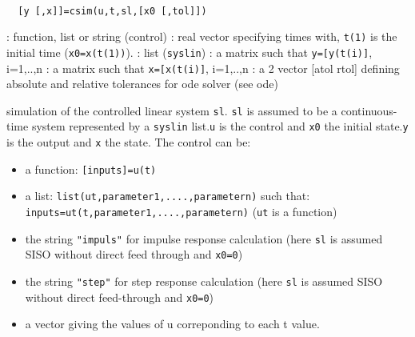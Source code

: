 \begin{mandesc}
   \\ %
\end{mandesc}
\begin{calling_sequence}
\begin{verbatim}
  [y [,x]]=csim(u,t,sl,[x0 [,tol]])  
\end{verbatim}
\end{calling_sequence}
\begin{parameters}
  \begin{varlist}
    : function, list or string (control)
    : real vector specifying times with, \verb!t(1)! is the initial
    time (\verb!x0=x(t(1))!).
    : list (\verb!syslin!)
    : a  matrix such that   \verb!y=[y(t(i)]!, i=1,..,n
    : a  matrix such that   \verb!x=[x(t(i)]!, i=1,..,n
    : a 2 vector [atol rtol] defining absolute and relative
    tolerances for ode solver (see ode)
  \end{varlist}
\end{parameters}
\begin{mandescription}

  simulation of the controlled linear system \verb!sl!.  \verb!sl! is assumed to
  be a continuous-time system represented by a \verb!syslin! list.\verb!u! is
  the control and \verb!x0! the initial state.\verb!y! is the output and
  \verb!x! the state.
  The control can be:
  \begin{itemize}
  \item a function: \verb![inputs]=u(t)!
  \item a list: \verb!list(ut,parameter1,....,parametern)! such that:
    \verb!inputs=ut(t,parameter1,....,parametern)! (\verb!ut! is a function)
  \item the string \verb!"impuls"! for impulse response calculation
    (here \verb!sl! is assumed SISO without direct feed through and \verb!x0=0!)
  \item the string \verb!"step"! for step response calculation 
    (here \verb!sl! is assumed SISO without direct feed-through and
    \verb!x0=0!)
  \item a vector giving the values of u correponding to each t value.
  \end{itemize}
\end{mandescription}
